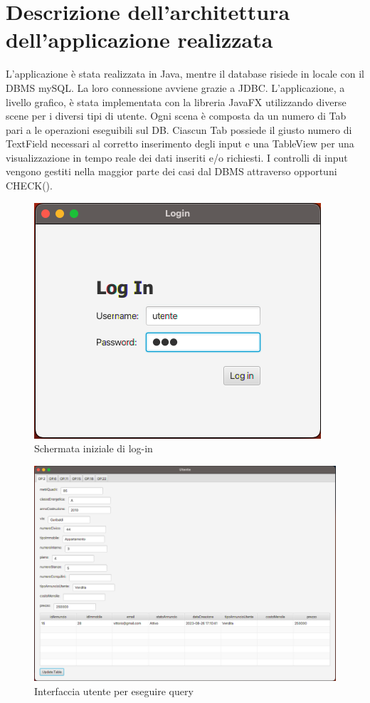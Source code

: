\documentclass[a4paper,12pt]{report}
\begin{document}
    	\section{Descrizione dell'architettura dell'applicazione realizzata}
        L'applicazione è stata realizzata in Java, mentre il database risiede in locale con il DBMS mySQL. La loro connessione avviene grazie a JDBC. 
        L'applicazione, a livello grafico, è stata implementata con la libreria JavaFX utilizzando diverse scene per i diversi tipi di utente.
        Ogni scena è composta da un numero di Tab pari a le operazioni eseguibili sul DB.
        Ciascun Tab possiede il giusto numero di TextField necessari al corretto inserimento degli input e una TableView per una visualizzazione in 
        tempo reale dei dati inseriti e/o richiesti.
        I controlli di input vengono gestiti nella maggior parte dei casi dal DBMS attraverso opportuni CHECK().
        \begin{figure}[H]
            \centering{}
            \includegraphics[width=0.50\linewidth]{./images/db1.png}
            \caption{Schermata iniziale di log-in}
        \end{figure}

        \begin{figure}[H]
            \centering{}
            \includegraphics[width=\linewidth]{./images/db2.png}
            \caption{Interfaccia utente per eseguire query}
        \end{figure}
\end{document}

